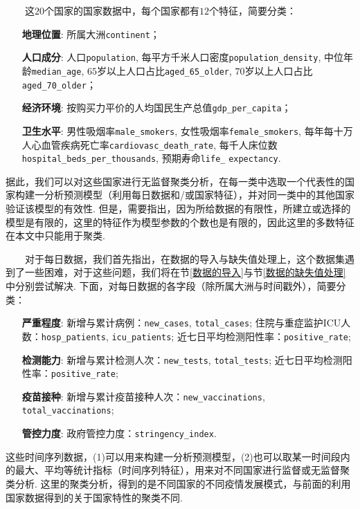 \documentclass[a4paper, titlepage]{article}
\begin{document}
        　　这$20$个国家的国家数据中，每个国家都有$12$个特征，简要分类：
        {\kaishu
        \begin{itemize}[itemsep=-1pt,topsep=1pt]
            \item [\textbf{地理位置}:]所属大洲\texttt{continent}；
            \item [\textbf{人口成分}:]人口\texttt{population}, 每平方千米人口密度\texttt{population\_density}, 中位年龄\texttt{median\_age}, $65$岁以上人口占比\texttt{aged\_65\_older}, $70$岁以上人口占比\texttt{aged\_70\_older}；
            \item [\textbf{经济环境}:]按购买力平价的人均国民生产总值\texttt{gdp\_per\_capita}；
            \item [\textbf{卫生水平}:]男性吸烟率\texttt{male\_smokers}, 女性吸烟率\texttt{female\_smokers}, 每年每十万人心血管疾病死亡率\texttt{cardiovasc\_death\_rate}, 每千人床位数\texttt{hospital\_beds\_per\_thousands}, 预期寿命\texttt{life\_} \texttt{expectancy}.
        \end{itemize}
        }
        据此，我们可以对这些国家进行无监督聚类分析，在每一类中选取一个代表性的国家构建一分析预测模型（利用每日数据和/或国家特征），并对同一类中的其他国家验证该模型的有效性. 但是，需要指出，因为所给数据的有限性，所建立或选择的模型是有限的，这里的特征作为模型参数的个数也是有限的，因此这里的多数特征在本文中只能用于聚类.

        　　对于每日数据，我们首先指出，在数据的导入与缺失值处理上，这个数据集遇到了一些困难，对于这些问题，我们将在节\ref{数据的导入}与节\ref{数据的缺失值处理}中分别尝试解决. 下面，对每日数据的各字段（除所属大洲与时间戳外），简要分类：
        {\kaishu
        \begin{itemize}[itemsep=-1pt,topsep=1pt]
            \item [\textbf{严重程度}:] 新增与累计病例：\texttt{new\_cases}, \texttt{total\_cases}; 住院与重症监护ICU人数：\texttt{hosp\_patients}, \texttt{icu\_patients}; 近七日平均检测阳性率：\texttt{positive\_rate};
            \item [\textbf{检测能力}:] 新增与累计检测人次：\texttt{new\_tests}, \texttt{total\_tests}; 近七日平均检测阳性率：\texttt{positive\_rate};
            \item [\textbf{疫苗接种}:] 新增与累计疫苗接种人次：\texttt{new\_vaccinations}, \texttt{total\_vaccinations}; 
            \item [\textbf{管控力度}:] 政府管控力度：\texttt{stringency\_index}.
        \end{itemize}
        }
        这些时间序列数据，(1)可以用来构建一分析预测模型，(2)也可以取某一时间段内的最大、平均等统计指标（时间序列特征），用来对不同国家进行监督或无监督聚类分析. 这里的聚类分析，得到的是不同国家的不同疫情发展模式，与前面的利用国家数据得到的关于国家特性的聚类不同.
\end{document}
